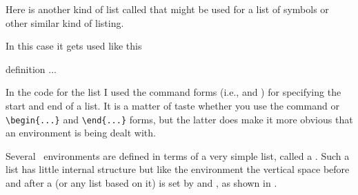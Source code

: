 Here is another kind of list called  that might be used
for a list of symbols or other similar kind of listing.
\begin{lcode}
\newenvironment{symbols}%
               {\list{}%
                            {\setlength{\topsep}{\baselineskip}
                             \setlength{\partopsep}{0pt}
                             \setlength{\itemsep}{0.5\baselineskip}
                             \setlength{\parsep}{0pt}
                             \setlength{\leftmargin}{2em}
                             \setlength{\rightmargin}{0em}
                             \setlength{\listparindent}{1em}
                             \setlength{\itemindent}{0em}
                             \setlength{\labelwidth}{0em}
                             \setlength{\labelsep}{2em}}}%
               {\endlist}
\newcommand{\symb}[1]{\item[#1]\mbox{}\\\nopagebreak}
\end{lcode}
In this case it gets used like this
\begin{lcode}
\begin{symbols}
 definition
 ...
\end{symbols}
\end{lcode}

    In the code for the  list I used the command forms (i.e.,
\cmd{\list} and \cmd{\endlist}) for specifying the start and end of a list.
It is a matter of taste whether you use the command or \verb?\begin{...}?
and \verb?\end{...}? forms, but the latter does make it more obvious that
an environment is being dealt with.


    Several \ltx\ environments are defined in terms of a very simple list,
called a . Such a list has little internal structure
but like the  environment the vertical space before and after
a  (or any list based on it) is set by \lnc{\topsep} and
\lnc{\partopsep}, as shown in .

